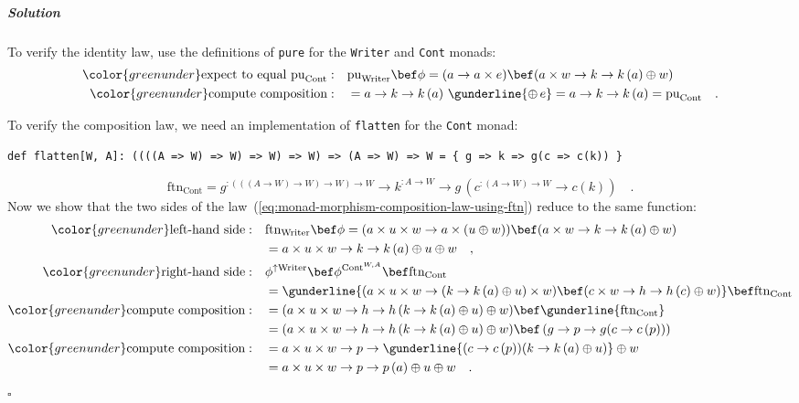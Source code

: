 \subparagraph{Solution}

To verify the identity law, use the definitions of \lstinline!pure!
for the \lstinline!Writer! and \lstinline!Cont! monads:
\begin{align*}
{\color{greenunder}\text{expect to equal }\text{pu}_{\text{Cont}}:}\quad & \text{pu}_{\text{Writer}}\bef\phi=(a\rightarrow a\times e)\bef(a\times w\rightarrow k\rightarrow k\left(a\right)\oplus w)\\
{\color{greenunder}\text{compute composition}:}\quad & =a\rightarrow k\rightarrow k\left(a\right)\,\gunderline{\oplus\,e}=a\rightarrow k\rightarrow k\left(a\right)=\text{pu}_{\text{Cont}}\quad.
\end{align*}

To verify the composition law, we need an implementation of \lstinline!flatten!
for the \lstinline!Cont! monad:
\begin{lstlisting}
def flatten[W, A]: ((((A => W) => W) => W) => W) => (A => W) => W = { g => k => g(c => c(k)) }
\end{lstlisting}
\[
\text{ftn}_{\text{Cont}}=g^{:\left(\left(\left(A\rightarrow W\right)\rightarrow W\right)\rightarrow W\right)\rightarrow W}\rightarrow k^{:A\rightarrow W}\rightarrow g\,(c^{:\left(A\rightarrow W\right)\rightarrow W}\rightarrow c\left(k\right))\quad.
\]
Now we show that the two sides of the law~(\ref{eq:monad-morphism-composition-law-using-ftn})
reduce to the same function:
\begin{align*}
{\color{greenunder}\text{left-hand side}:}\quad & \text{ftn}_{\text{Writer}}\bef\phi=(a\times u\times w\rightarrow a\times(u\oplus w))\bef(a\times w\rightarrow k\rightarrow k\left(a\right)\oplus w)\\
 & =a\times u\times w\rightarrow k\rightarrow k\left(a\right)\oplus u\oplus w\quad,\\
{\color{greenunder}\text{right-hand side}:}\quad & \phi^{\uparrow\text{Writer}}\bef\phi^{\text{Cont}^{W,A}}\bef\text{ftn}_{\text{Cont}}\\
 & =\gunderline{(a\times u\times w\rightarrow(k\rightarrow k\left(a\right)\oplus u)\times w)\bef(c\times w\rightarrow h\rightarrow h\left(c\right)\oplus w)}\bef\text{ftn}_{\text{Cont}}\\
{\color{greenunder}\text{compute composition}:}\quad & =(a\times u\times w\rightarrow h\rightarrow h\left(k\rightarrow k\left(a\right)\oplus u\right)\oplus w)\bef\gunderline{\text{ftn}_{\text{Cont}}}\\
 & =(a\times u\times w\rightarrow h\rightarrow h\left(k\rightarrow k\left(a\right)\oplus u\right)\oplus w)\bef\left(g\rightarrow p\rightarrow g(c\rightarrow c\left(p\right))\right)\\
{\color{greenunder}\text{compute composition}:}\quad & =a\times u\times w\rightarrow p\rightarrow\gunderline{(c\rightarrow c\left(p\right))(k\rightarrow k\left(a\right)\oplus u)}\oplus w\\
 & =a\times u\times w\rightarrow p\rightarrow p\left(a\right)\oplus u\oplus w\quad.
\end{align*}
$\square$

